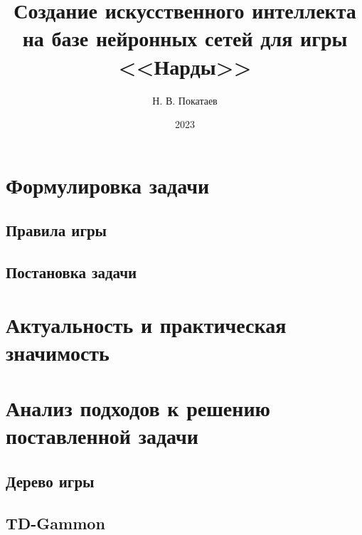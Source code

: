 \documentclass{vsciwork}
\title{Создание искусственного интеллекта на базе нейронных сетей для игры <<Нарды>>}
\author{Н. В. Покатаев}
\date{2023}
\begin{document}
\maketitle

\tableofcontents



\section{Формулировка задачи}

\subsection{Правила игры}


\subsection{Постановка задачи}


\section{Актуальность и практическая значимость}


\section{Анализ подходов к решению поставленной задачи}

\subsection{Дерево игры}


\subsection{TD-Gammon}





\end{document}
